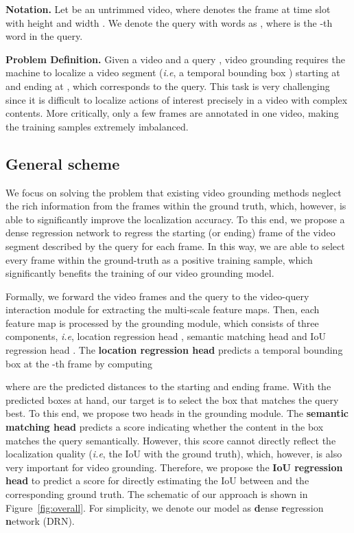 \documentclass[10pt,twocolumn,letterpaper]{article}
\def\ie{\emph{i.e}\onedot} \def\Ie{\emph{I.e}\onedot}
\begin{document}
	\noindent \textbf{Notation.}
	Let  be an untrimmed video, where  denotes the frame at time slot  with height  and width .
	We denote the query with  words as , where  is the -th word in the query. 
	
	\noindent \textbf{Problem Definition.}
	Given a video  and a query , video grounding requires the machine to localize a video segment (\ie, a temporal bounding box ) starting at  and ending at , which corresponds to the query.
This task is very challenging since it is difficult to localize actions of interest precisely in a video with complex contents. More critically, only a few frames are annotated in one video, making the training samples extremely imbalanced.
	
	\subsection{General scheme}
	\label{sec:general}
	




We focus on solving the problem that existing video grounding methods neglect the rich information from the frames within the ground truth, which, however, is able to significantly improve the localization accuracy. 
To this end, we propose a dense regression network to regress the starting (or ending) frame of the video segment described by the query for each frame. In this way, we are able to select every frame within the ground-truth as a positive training sample, which significantly benefits the training of our video grounding model.
	


	
Formally, we forward the video frames  and the query  to the video-query interaction module  for extracting the multi-scale feature maps. Then, each  feature map is processed by the grounding module, which consists of three components, \ie, location regression head , semantic matching head  and IoU regression head . The \textbf{location regression head} predicts a temporal bounding box  at the -th frame by computing
	
	where  are the predicted distances to the starting and ending frame. With the predicted boxes  at hand, our target is to select the box that matches the query best. To this end, we propose two heads in the grounding module.
	The \textbf{semantic matching head} predicts a score  indicating whether the content in the box  matches the query semantically. However, this score cannot directly reflect the localization quality (\ie, the IoU with the ground truth), which, however, is also very important for video grounding. Therefore, we propose the \textbf{IoU regression head} to predict a score  for directly estimating the IoU between  and the corresponding ground truth. 
The schematic of our approach is shown in Figure~\ref{fig:overall}. For simplicity, we denote our model as \textbf{d}ense \textbf{r}egression \textbf{n}etwork (DRN).
	
\end{document}
